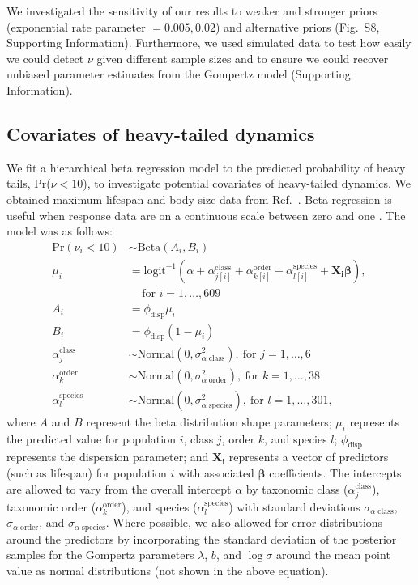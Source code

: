 \documentclass[9pt,twocolumn,twoside]{pnas-new}
\newcommand{\figpriors}{{8}}
\begin{document}
{We investigated the sensitivity
of our results to weaker and stronger priors (exponential rate parameter $=
0.005, 0.02$) and alternative priors (Fig.~S\figpriors, Supporting Information).
Furthermore, we used
simulated data to test how easily we could detect $\nu$ given different sample
sizes and to ensure we could recover unbiased parameter estimates from the
Gompertz model (Supporting Information).

\subsection{Covariates of heavy-tailed dynamics} We fit a hierarchical beta
regression model to the predicted probability of heavy tails, Pr(\(\nu < 10\)),
to investigate potential covariates of heavy-tailed dynamics. We obtained
maximum lifespan and body-size data from Ref.~\cite{brook2006a}.
Beta regression is useful when response data are on a continuous scale
between zero and one \cite{ferrari2004}. The model was as follows:
\begin{align*}
\mathrm{Pr}(\nu_i < 10) &\sim \mathrm{Beta}(A_i, B_i)\\
\mu_i &= \mathrm{logit}^{-1}(\alpha
  + \alpha^\mathrm{class}_{j[i]}
  + \alpha^\mathrm{order}_{k[i]}
  + \alpha^\mathrm{species}_{l[i]}
  + \bm{X_i} \bm{\beta}),
  \: \\
  &\quad \, \text{for } i = 1, \dots, 609\\
A_i &= \phi_\mathrm{disp} \mu_i\\
B_i &= \phi_\mathrm{disp} (1 - \mu_i)\\
\alpha^\mathrm{class}_j &\sim
  \mathrm{Normal}(0, \sigma^2_{\alpha \; \mathrm{class}}),
  \: \text{for } j = 1, \dots, 6\\
\alpha^\mathrm{order}_k &\sim
  \mathrm{Normal}(0, \sigma^2_{\alpha \; \mathrm{order}}),
  \: \text{for } k = 1, \dots, 38\\
\alpha^\mathrm{species}_l &\sim
  \mathrm{Normal}(0, \sigma^2_{\alpha \; \mathrm{species}}),
  \: \text{for } l = 1, \dots, 301,
\end{align*}
where \(A\) and \(B\) represent the beta distribution shape parameters;
\(\mu_i\) represents the predicted value for population \(i\), class \(j\),
order \(k\), and species \(l\); \(\phi_\mathrm{disp}\) represents the
dispersion parameter; and \(\bm{X_i}\) represents a vector of predictors (such as
lifespan) for population \(i\) with associated \(\bm{\beta}\) coefficients. The
intercepts are allowed to vary from the overall intercept \(\alpha\) by
taxonomic class (\(\alpha^\mathrm{class}_j\)), taxonomic order
(\(\alpha^\mathrm{order}_k\)), and species (\(\alpha^\mathrm{species}_l\)) with
standard deviations \(\sigma_{\alpha \; \mathrm{class}}\), \(\sigma_{\alpha \;
\mathrm{order}}\), and \(\sigma_{\alpha \; \mathrm{species}}\). Where possible,
we also allowed for error distributions around the predictors by incorporating
the standard deviation of the posterior samples for the Gompertz parameters
\(\lambda\), \(b\), and \(\log \sigma\) around the mean point value as normal
distributions (not shown in the above equation).

}
\end{document}

